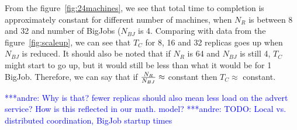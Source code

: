 \documentclass{rspublic}
\newcommand{\alnote}[1]{ {\textcolor{blue} { ***andre: #1 }}}
\newcommand{\alnote}[1]{}
\begin{document}
From the figure~\ref{fig:24machines}, we see that total time to completion is approximately constant for different number of machines, when $N_R$ is between 8 and 32 and number of BigJobs ($N_{BJ}$ is 4. Comparing with data from the figure~\ref{fig:scaleup}, we can see that $T_C$ for 8, 16 and 32 replicas goes up when $N_{BJ}$ is reduced. It should also be noted that if $N_R$ is 64 and $N_{BJ}$ is still 4, $T_C$ might start to go up, but it would still be less than what it would be for 1 BigJob. Therefore, we can say that if ${N_R \over N_{BJ} }\approx$ constant then $T_C \approx$ constant.



\alnote{Why is that? fewer replicas should also mean less load on the advert service? How is this reflected in 
our math. model?}
\alnote{TODO: Local vs. distributed coordination, BigJob startup times}



\end{document}
